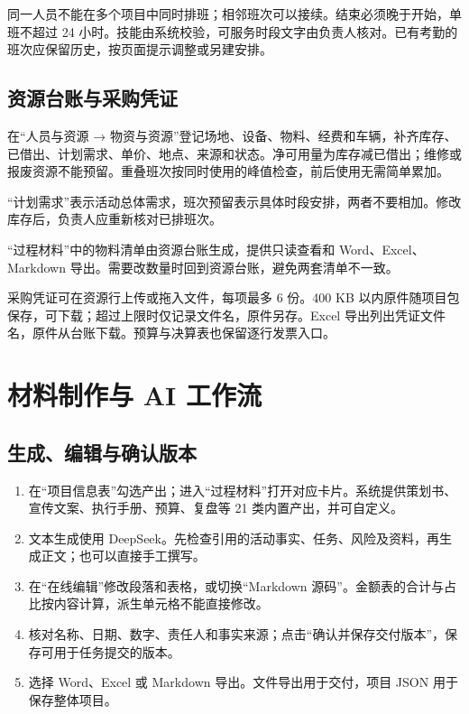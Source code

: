 \documentclass[UTF8,fontset=windows,zihao=-4,a4paper]{ctexart}
\begin{document}
同一人员不能在多个项目中同时排班；相邻班次可以接续。结束必须晚于开始，单班不超过 24 小时。技能由系统校验，可服务时段文字由负责人核对。已有考勤的班次应保留历史，按页面提示调整或另建安排。


\subsection*{资源台账与采购凭证}

在“人员与资源 → 物资与资源”登记场地、设备、物料、经费和车辆，补齐库存、已借出、计划需求、单价、地点、来源和状态。净可用量为库存减已借出；维修或报废资源不能预留。重叠班次按同时使用的峰值检查，前后使用无需简单累加。


“计划需求”表示活动总体需求，班次预留表示具体时段安排，两者不要相加。修改库存后，负责人应重新核对已排班次。


“过程材料”中的物料清单由资源台账生成，提供只读查看和 Word、Excel、Markdown 导出。需要改数量时回到资源台账，避免两套清单不一致。


采购凭证可在资源行上传或拖入文件，每项最多 6 份。400 KB 以内原件随项目包保存，可下载；超过上限时仅记录文件名，原件另存。Excel 导出列出凭证文件名，原件从台账下载。预算与决算表也保留逐行发票入口。


\section{材料制作与 AI 工作流}\label{sec:4}

\subsection*{生成、编辑与确认版本}

\begin{enumerate}[start=1]

\item 在“项目信息表”勾选产出；进入“过程材料”打开对应卡片。系统提供策划书、宣传文案、执行手册、预算、复盘等 21 类内置产出，并可自定义。

\item 文本生成使用 DeepSeek。先检查引用的活动事实、任务、风险及资料，再生成正文；也可以直接手工撰写。

\item 在“在线编辑”修改段落和表格，或切换“Markdown 源码”。金额表的合计与占比按内容计算，派生单元格不能直接修改。

\item 核对名称、日期、数字、责任人和事实来源；点击“确认并保存交付版本”，保存可用于任务提交的版本。

\item 选择 Word、Excel 或 Markdown 导出。文件导出用于交付，项目 JSON 用于保存整体项目。

\end{enumerate}
\end{document}
